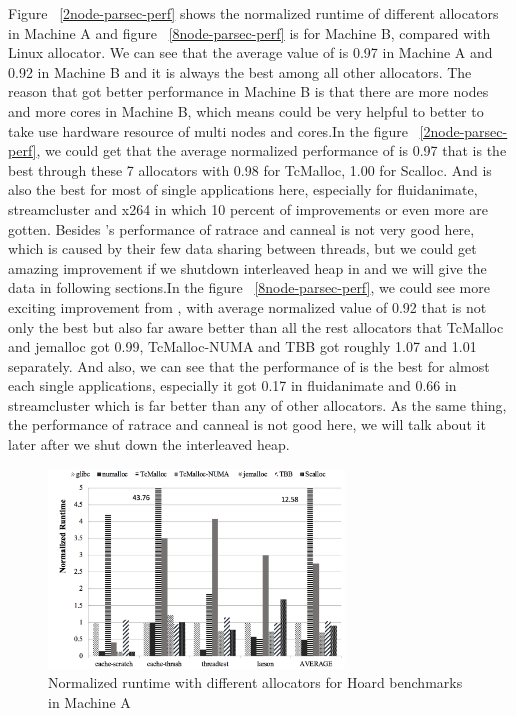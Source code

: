 Figure ~\ref{2node-parsec-perf} shows the normalized runtime of different allocators in Machine A and figure ~\ref{8node-parsec-perf} is for Machine B, compared with Linux allocator. We can see that the average value of \NM{} is 0.97 in Machine A and 0.92 in Machine B and it is always the best among all other allocators. The reason that \NM{} got better performance in Machine B is that there are more nodes and more cores in Machine B, which means \NM{} could be very helpful to better to take use hardware resource of multi nodes and cores.In the figure ~\ref{2node-parsec-perf}, we could get that the average normalized performance of \NM{} is 0.97 that is the best through these 7 allocators with 0.98 for TcMalloc, 1.00 for Scalloc. And \NM{} is also the best for most of single applications here, especially for fluidanimate, streamcluster and x264 in which 10 percent of improvements or even more are gotten. Besides \NM{}'s performance of  ratrace and canneal is not very good here, which is caused by their few data sharing between threads, but we could get amazing improvement if we shutdown interleaved heap in \NM{} and we will give the data in following sections.In the figure ~\ref{8node-parsec-perf}, we could see more exciting improvement from \NM{}, with average normalized value of 0.92 that is not only the best but also far aware better than all the rest allocators that TcMalloc and jemalloc got 0.99, TcMalloc-NUMA and TBB got roughly 1.07 and 1.01 separately. And also, we can see that the performance of \NM{} is the best for almost each single applications, especially it got 0.17 in fluidanimate and 0.66 in streamcluster which is far better than any of other allocators. As the same thing, the performance of ratrace and canneal is not good here, we will talk about it later after we shut down the interleaved heap.

\begin{figure}[H]
    \centering
    \includegraphics[width=\textwidth,height=200]{figure/2-node-hoard-perf.png}
    \caption{Normalized runtime with different allocators for Hoard benchmarks in Machine A}
    \label{2node-hoard-perf}
\end{figure}

